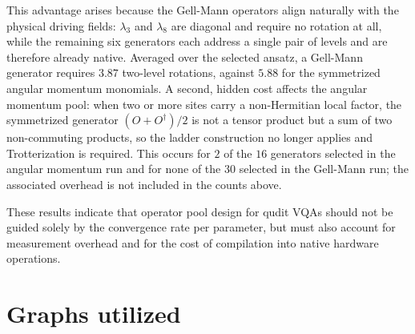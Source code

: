 \begin{table}[htbp]
\centering
\caption{Native gate decomposition at the target precision $\epsilon_{\mathrm{rel}} = 10^{-3}$.}
\label{tab:native_gate_counts}
\end{table}

This advantage arises because the Gell-Mann operators align naturally with the physical driving fields: $\lambda_3$ and $\lambda_8$ are diagonal and require no rotation at all, while the remaining six generators each address a single pair of levels and are therefore already native. Averaged over the selected ansatz, a Gell-Mann generator requires $3.87$ two-level rotations, against $5.88$ for the symmetrized angular momentum monomials. A second, hidden cost affects the angular momentum pool: when two or more sites carry a non-Hermitian local factor, the symmetrized generator $(O+O^\dagger)/2$ is not a tensor product but a sum of two non-commuting products, so the ladder construction no longer applies and Trotterization is required. This occurs for $2$ of the $16$ generators selected in the angular momentum run and for none of the $30$ selected in the Gell-Mann run; the associated overhead is not included in the counts above.

These results indicate that operator pool design for qudit VQAs should not be guided solely by the convergence rate per parameter, but must also account for measurement overhead and for the cost of compilation into native hardware operations.



\section{Graphs utilized}
\label{appendix_graphs}

